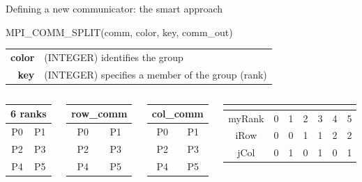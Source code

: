 \documentclass[aspectratio=43]{beamer}
\begin{document}
\begin{frame}[fragile]{Defining a new communicator: the smart approach}
\begin{Fortranlisting}[]{}
MPI_COMM_SPLIT(comm, color, key, comm_out)
\end{Fortranlisting}
\begin{black1block}{}
\begin{tabular}{rp{8cm}}
\textbf{color} & (INTEGER) identifies the group\\
    \textbf{key} & (INTEGER) specifies a member of the group (rank)\\
\end{tabular}
\end{black1block}
\begin{columns}
\begin{column}{0.2\paperwidth}
\begin{tabular}{|c|c|}
    \multicolumn{2}{c}{6 ranks} \\\hline
    P0 & P1 \\\hline
    P2 & P3 \\\hline
    P4 & P5 \\\hline
\end{tabular}
\end{column}
\begin{column}{0.2\paperwidth}
\begin{tabular}{|c|c|}
    \multicolumn{2}{c}{row\_comm} \\\hline
    \color{cscsred}P0 & \color{cscsred}P1 \\\hline
    \color{cscsgreen}P2 & \color{cscsgreen}P3 \\\hline
    \color{cscsblue}P4 & \color{cscsblue}P5 \\\hline
\end{tabular}
\end{column}
\begin{column}{0.19\paperwidth}
\begin{tabular}{|c|c|}
    \multicolumn{2}{c}{col\_comm} \\\hline
    \color{cscsred}P0 & \color{cscsblue}P1 \\\hline
    \color{cscsred}P2 & \color{cscsblue}P3 \\\hline
    \color{cscsred}P4 & \color{cscsblue}P5 \\\hline
\end{tabular}
\end{column}
\begin{column}{0.41\paperwidth}
\begin{tabular}{|c|c|c|c|c|c|c|}
    \multicolumn{7}{c}{} \\\hline
myRank & 0 & 1 & 2 & 3 & 4 & 5 \\\hline
iRow & 0 & 0 & 1 & 1 & 2 & 2 \\\hline
jCol & 0 & 1 & 0 & 1 & 0 & 1 \\\hline
\end{tabular}
\end{column}


\end{columns}
\end{frame}
\end{document}
